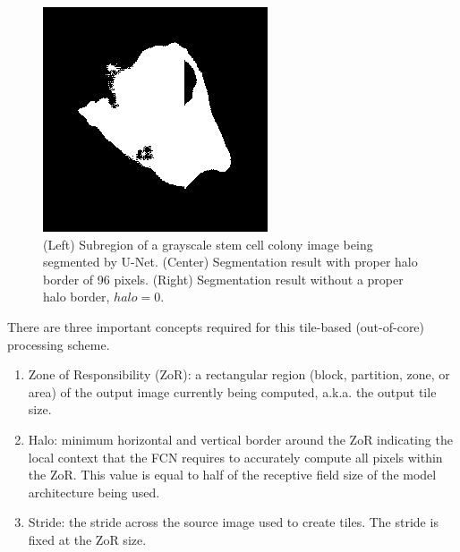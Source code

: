 \documentclass[runningheads]{llncs}
\begin{document}
\begin{figure}
\begin{minipage}{0.32\columnwidth}
	\end{minipage}
	\begin{minipage}{0.32\columnwidth}
		\includegraphics[width=\columnwidth]{figs/no_halo.png}
	\end{minipage}
	\caption{(Left) Subregion of a grayscale stem cell colony image being segmented by U-Net. (Center) Segmentation result with proper halo border of 96 pixels. (Right) Segmentation result without a proper halo border, $halo = 0$.} 
	\label{fig:nohalo}
\end{figure}

There are three important concepts required for this tile-based (out-of-core) processing scheme. 
\begin{enumerate}
	\item Zone of Responsibility (ZoR): a rectangular region (block, partition, zone, or area) of the output image currently being computed, a.k.a. the output tile size.
	\item Halo: minimum horizontal and vertical border around the ZoR indicating the local context that the FCN requires to accurately compute all pixels within the ZoR. This value is equal to half of the receptive field size of the model architecture being used. 
	\item Stride: the stride across the source image used to create tiles. The stride is fixed at the ZoR size.
\end{enumerate}
\end{document}
